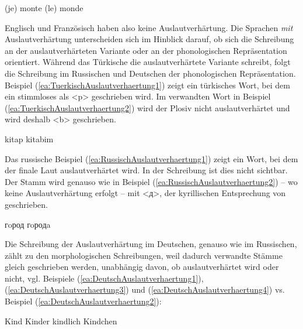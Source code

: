\ea \label{FranzoesischAuslaute}
\ea \label{ea:FranzoesischAuslaute1} (je) monte \textipa{[m\~Ot]} 
\ex \label{ea:FranzoesischAuslaute2} (le) monde \textipa{[m\~Od]} 
\z
\z

Englisch und Französisch haben also keine Auslautverhärtung. Die Sprachen \textit{mit} Auslautverhärtung unterscheiden sich im Hinblick darauf, ob sich die Schreibung an der auslautverhärteten Variante oder an der phonologischen Repräsentation orientiert. Während das Türkische die auslautverhärtete Variante schreibt, folgt die Schreibung im Russischen und Deutschen der phonologischen Repräsentation. Beispiel (\ref{ea:TuerkischAuslautverhaertung1}) zeigt ein türkisches Wort, bei dem ein stimmloses \textipa{[p]} als <p> geschrieben wird. Im verwandten Wort in Beispiel (\ref{ea:TuerkischAuslautverhaertung2}) wird der Plosiv nicht auslautverhärtet und wird deshalb <b> geschrieben.


\ea \label{TuerkischAuslautverhaertung}
\ea \label{ea:TuerkischAuslautverhaertung1} kitap \textipa{[kitap]} 
\ex \label{ea:TuerkischAuslautverhaertung2} kitabim \textipa{[kitabim]} 
\z
\z

 
Das russische Beispiel (\ref{ea:RussischAuslautverhaertung1}) zeigt ein Wort, bei dem der finale Laut auslautverhärtet wird. In der Schreibung ist dies nicht sichtbar. Der Stamm wird genauso wie in Beispiel (\ref{ea:RussischAuslautverhaertung2}) -- wo keine Auslautverhärtung erfolgt --  mit <д>, der kyrillischen Entsprechung von  geschrieben.


\ea \label{RussischAuslautverhaertung}
\ea \label{ea:RussischAuslautverhaertung1} гoрод \textipa{[\textprimstress gO.r@t]} 
\ex \label{ea:RussischAuslautverhaertung2} гoродa  \textipa{[g@.r5\textprimstress da]} 
\z
\z


Die Schreibung der Auslautverhärtung im Deutschen, genauso wie im Russischen, zählt zu den morphologischen Schreibungen, weil dadurch verwandte Stämme gleich geschrieben werden, unabhängig davon, ob auslautverhärtet wird oder nicht, vgl. Beispiele (\ref{ea:DeutschAuslautverhaertung1}), (\ref{ea:DeutschAuslautverhaertung3}) und (\ref{ea:DeutschAuslautverhaertung4}) vs. Beispiel (\ref{ea:DeutschAuslautverhaertung2}):

\ea \label{DeutschAuslautverhaertung}
\ea \label{ea:DeutschAuslautverhaertung1} Kind 
\ex \label{ea:DeutschAuslautverhaertung2} Kinder  
\ex \label{ea:DeutschAuslautverhaertung3} kindlich  
\ex \label{ea:DeutschAuslautverhaertung4} Kindchen  
\z
\z


